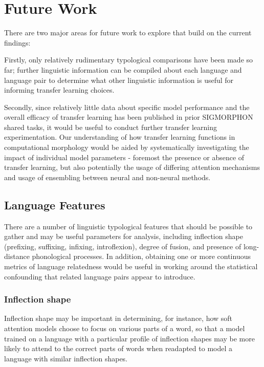 \chapter{Future Work}

There are two major areas for future work to explore that build on the current findings:

Firstly, only relatively rudimentary typological comparisons have been made so far; further linguistic information can be compiled about each language and language pair to determine what other linguistic information is useful for informing transfer learning choices. 

Secondly, since relatively little data about specific model performance and the overall efficacy of transfer learning has been published in prior SIGMORPHON shared tasks, it would be useful to conduct further transfer learning experimentation. Our understanding of how transfer learning functions in computational morphology would be aided by systematically investigating the impact of individual model parameters - foremost the presence or absence of transfer learning, but also potentially the usage of differing attention mechanisms and usage of ensembling between neural and non-neural methods.

\section{Language Features}

There are a number of linguistic typological features that should be possible to gather and may be useful parameters for analysis, including inflection shape (prefixing, suffixing, infixing, introflexion), degree of fusion, and presence of long-distance phonological processes. In addition, obtaining one or more continuous metrics of language relatedness would be useful in working around the statistical confounding that related language pairs appear to introduce.

\subsection{Inflection shape}

Inflection shape may be important in determining, for instance, how soft attention models choose to focus on various parts of a word, so that a model trained on a language with a particular profile of inflection shapes may be more likely to attend to the correct parts of words when readapted to model a language with similar inflection shapes. 

